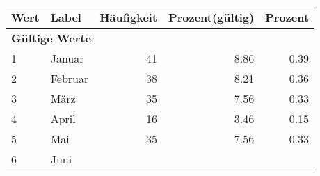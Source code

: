     \begin{longtable}{lXrrr}
     \toprule
     \textbf{Wert} & \textbf{Label} & \textbf{Häufigkeit} & \textbf{Prozent(gültig)} & \textbf{Prozent} \\
     \endhead
     \midrule
     \multicolumn{5}{l}{\textbf{Gültige Werte}}\\

     1 &
     \multicolumn{1}{X}{ Januar   } &


       \num{41} &
       \num[round-mode=places,round-precision=2]{8,86} &
         \num[round-mode=places,round-precision=2]{0,39} \\

     2 &
     \multicolumn{1}{X}{ Februar   } &


       \num{38} &
       \num[round-mode=places,round-precision=2]{8,21} &
         \num[round-mode=places,round-precision=2]{0,36} \\

     3 &
     \multicolumn{1}{X}{ März   } &


       \num{35} &
       \num[round-mode=places,round-precision=2]{7,56} &
         \num[round-mode=places,round-precision=2]{0,33} \\

     4 &
     \multicolumn{1}{X}{ April   } &


       \num{16} &
       \num[round-mode=places,round-precision=2]{3,46} &
         \num[round-mode=places,round-precision=2]{0,15} \\

     5 &
     \multicolumn{1}{X}{ Mai   } &


       \num{35} &
       \num[round-mode=places,round-precision=2]{7,56} &
         \num[round-mode=places,round-precision=2]{0,33} \\

     6 &
     \multicolumn{1}{X}{ Juni   } &



\end{longtable}

